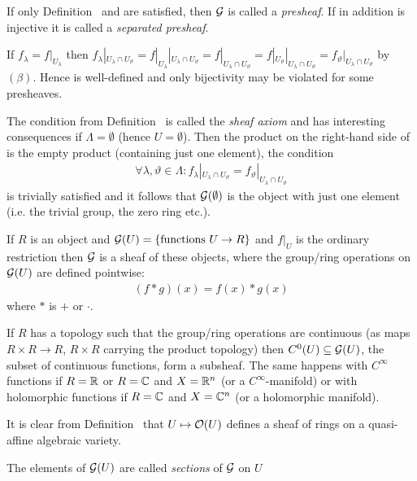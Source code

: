 \documentclass[a4paper,parskip=half,numbers=enddot, DIV=12]{scrreprt}
\begin{document}
	\begin{rem*}
		\begin{alphanumerate}
			\item If only Definition~ and  are satisfied, then $\mathcal{G}$ is called a \emph{presheaf}. If in addition  is injective it is called a \emph{separated presheaf}.
			\item If $f_\lambda = f|_{U_\lambda}$ then $f_\lambda|_{U_\lambda\cap U_\vartheta} = f|_{U_\lambda}|_{U_\lambda\cap U_\vartheta} = f|_{U_\lambda\cap U_\vartheta} = f|_{U_\vartheta}|_{U_\lambda\cap U_\vartheta} = f_\vartheta|_{U_\lambda\cap U_\vartheta}$ by $(\beta)$. Hence  is well-defined and only bijectivity may be violated for some presheaves.
			\item The condition from Definition~ is called the \emph{sheaf axiom} and has interesting consequences if $\Lambda=\emptyset$ (hence $U=\emptyset$). Then the product on the right-hand side of  is the empty product (containing just one element), the condition
			\begin{align*}
			\forall \lambda, \vartheta\in \Lambda\colon f_\lambda|_{U_\lambda\cap U_\vartheta} = f_\vartheta|_{U_\lambda\cap U_\vartheta}
			\end{align*}
			is trivially satisfied and it follows that $\mathcal{G}(\emptyset)$ is the object with just one element (i.e. the trivial group, the zero ring etc.).
			\item If $R$ is an object and $\mathcal{G}(U) = \left\{\text{functions } U\to R\right\}$ and $f|_U$ is the ordinary restriction then $\mathcal{G}$ is a sheaf of these objects, where the group/ring operations on $\mathcal{G}(U)$ are defined pointwise:
			\begin{align*}
			(f* g)(x) = f(x)* g(x)
			\end{align*}
			where $*$ is $+$ or $\cdot$.
			\item If $R$ has a topology such that the group/ring operations are continuous (as maps $R\times R \to R$, $R\times R$ carrying the product topology) then $C^0(U)\subseteq \mathcal{G}(U)$, the subset of continuous functions, form a subsheaf. The same happens with $C^\infty$ functions if $R=\mathbb{R}$ or $R=\mathbb{C}$ and $X=\mathbb{R}^n$ (or a $C^\infty$-manifold) or with holomorphic functions if $R= \mathbb{C}$ and $X=\mathbb{C}^n$ (or a holomorphic manifold).
			\item It is clear from Definition~ that $U\mapsto \mathcal{O}(U)$ defines a sheaf of rings on a quasi-affine algebraic variety.
			\item The elements of $\mathcal{G}(U)$ are called \emph{sections} of $\mathcal{G}$ on $U$
		\end{alphanumerate}
	\end{rem*}
\end{document}
